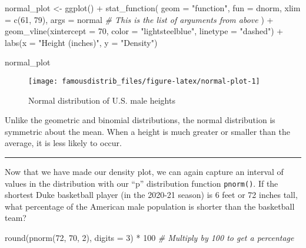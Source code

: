 \documentclass[
]{article}
\newenvironment{Shaded}{\begin{snugshade}}{\end{snugshade}}
\newcommand{\AttributeTok}[1]{\textcolor[rgb]{0.77,0.63,0.00}{#1}}
\newcommand{\CommentTok}[1]{\textcolor[rgb]{0.56,0.35,0.01}{\textit{#1}}}
\newcommand{\DecValTok}[1]{\textcolor[rgb]{0.00,0.00,0.81}{#1}}
\newcommand{\FunctionTok}[1]{\textcolor[rgb]{0.00,0.00,0.00}{#1}}
\newcommand{\NormalTok}[1]{#1}
\newcommand{\OtherTok}[1]{\textcolor[rgb]{0.56,0.35,0.01}{#1}}
\newcommand{\SpecialCharTok}[1]{\textcolor[rgb]{0.00,0.00,0.00}{#1}}
\newcommand{\StringTok}[1]{\textcolor[rgb]{0.31,0.60,0.02}{#1}}
\begin{document}
\begin{Shaded}
\begin{Highlighting}[]
\NormalTok{normal\_plot }\OtherTok{\textless{}{-}} \FunctionTok{ggplot}\NormalTok{() }\SpecialCharTok{+}
  \FunctionTok{stat\_function}\NormalTok{(}
    \AttributeTok{geom =} \StringTok{"function"}\NormalTok{,}
    \AttributeTok{fun =}\NormalTok{ dnorm,}
    \AttributeTok{xlim =} \FunctionTok{c}\NormalTok{(}\DecValTok{61}\NormalTok{, }\DecValTok{79}\NormalTok{),}
    \AttributeTok{args =}\NormalTok{ normal }\CommentTok{\# This is the list of arguments from above}
\NormalTok{  ) }\SpecialCharTok{+}
  \FunctionTok{geom\_vline}\NormalTok{(}\AttributeTok{xintercept =} \DecValTok{70}\NormalTok{, }\AttributeTok{color =} \StringTok{"lightsteelblue"}\NormalTok{, }\AttributeTok{linetype =} \StringTok{"dashed"}\NormalTok{) }\SpecialCharTok{+}
  \FunctionTok{labs}\NormalTok{(}\AttributeTok{x =} \StringTok{"Height (inches)"}\NormalTok{, }\AttributeTok{y =} \StringTok{"Density"}\NormalTok{)}

\NormalTok{normal\_plot}
\end{Highlighting}
\end{Shaded}

\begin{figure}

{\centering \texttt{[image: famousdistrib\_files/figure-latex/normal-plot-1]} 

}

\caption{Normal distribution of U.S. male heights}\label{fig:normal-plot}
\end{figure}

Unlike the geometric and binomial distributions, the normal distribution is symmetric about the mean. When a height is much greater or smaller than the average, it is less likely to occur.

\begin{center}\rule{0.5\linewidth}{0.5pt}\end{center}

Now that we have made our density plot, we can again capture an interval of values in the distribution with our ``p'' distribution function \texttt{pnorm()}. If the shortest Duke basketball player (in the 2020-21 season) is 6 feet or 72 inches tall, what percentage of the American male population is shorter than the basketball team?

\begin{Shaded}
\begin{Highlighting}[]
\FunctionTok{round}\NormalTok{(}\FunctionTok{pnorm}\NormalTok{(}\DecValTok{72}\NormalTok{, }\DecValTok{70}\NormalTok{, }\DecValTok{2}\NormalTok{), }\AttributeTok{digits =} \DecValTok{3}\NormalTok{) }\SpecialCharTok{*} \DecValTok{100} \CommentTok{\# Multiply by 100 to get a percentage}
\end{Highlighting}
\end{Shaded}
\end{document}

